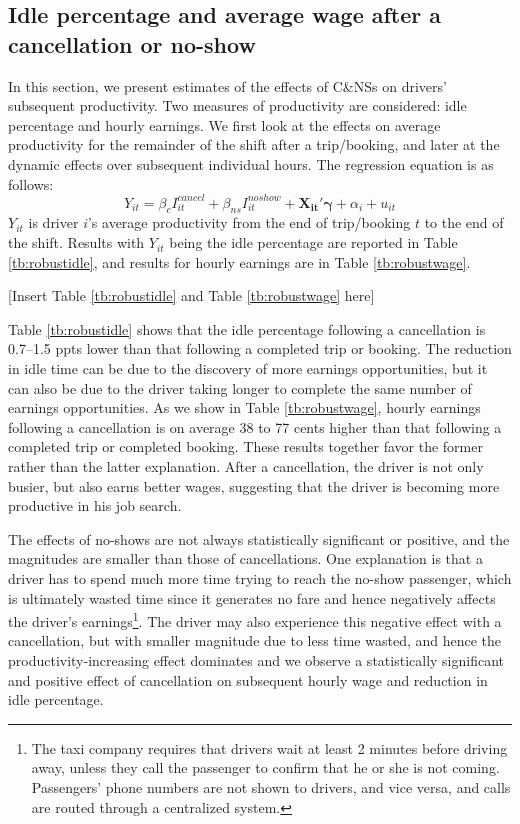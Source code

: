 \documentclass[reviewmode]{AEA}
\begin{document}
\subsection{Idle percentage and average wage after a cancellation or no-show}
In this section, we present estimates of the effects of C\&NSs on drivers' subsequent productivity. Two measures of productivity are considered: idle percentage and hourly earnings. We first look at the effects on average productivity for the remainder of the shift after a trip/booking, and later at the dynamic effects over subsequent individual hours. The regression equation is as follows:
\begin{equation}
\label{eq:outcomes}
Y_{it} = \beta_c I^{cancel}_{it} + \beta_{ns} I^{noshow}_{it} + \mathbf{X_{it}}'\mathbf{\gamma} + \alpha_i  + u_{it}
\end{equation}
$Y_{it}$ is driver $i$'s average productivity from the end of trip/booking $t$ to the end of the shift. Results with $Y_{it}$ being the idle percentage are reported in Table \ref{tb:robustidle}, and results for hourly earnings are in Table \ref{tb:robustwage}.

\begin{center}
	[Insert Table \ref{tb:robustidle} and Table \ref{tb:robustwage} here]
\end{center}

Table \ref{tb:robustidle} shows that the idle percentage following a cancellation is 0.7--1.5 ppts lower than that following a completed trip or booking. The reduction in idle time can be due to the discovery of more earnings opportunities, but it can also be due to the driver taking longer to complete the same number of earnings opportunities. As we show in Table \ref{tb:robustwage}, hourly earnings following a cancellation is on average 38 to 77 cents higher than that following a completed trip or completed booking. These results together favor the former rather than the latter explanation. After a cancellation, the driver is not only busier, but also earns better wages, suggesting that the driver is becoming more productive in his job search. 

The effects of no-shows are not always statistically significant or positive, and the magnitudes are smaller than those of cancellations. One explanation is that a driver has to spend much more time trying to reach the no-show passenger, which is ultimately wasted time since it generates no fare and hence negatively affects the driver's earnings\footnote{The taxi company requires that drivers wait at least 2 minutes before driving away, unless they call the passenger to confirm that he or she is not coming. Passengers' phone numbers are not shown to drivers, and vice versa, and calls are routed through a centralized system.}. The driver may also experience this negative effect with a cancellation, but with smaller magnitude due to less time wasted, and hence the productivity-increasing effect dominates and we observe a statistically significant and positive effect of cancellation on subsequent hourly wage and reduction in idle percentage.
\end{document}
